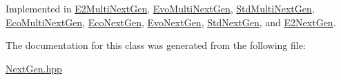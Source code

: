 Implemented in \hyperlink{classE2MultiNextGen_a22721fa0e9c2cbe1de3d0d6bb78932f0}{E2\+Multi\+Next\+Gen}, \hyperlink{classEvoMultiNextGen_acab6fd876dc02feae353b52461b88861}{Evo\+Multi\+Next\+Gen}, \hyperlink{classStdMultiNextGen_a4e3a48cdc731da26abe8b1f32cdbf962}{Std\+Multi\+Next\+Gen}, \hyperlink{classEcoMultiNextGen_a956065141696cac390d8acb8ca5bcccb}{Eco\+Multi\+Next\+Gen}, \hyperlink{classEcoNextGen_a4cb2fccbd3221f41c249c97af461dd3c}{Eco\+Next\+Gen}, \hyperlink{classEvoNextGen_af9ee37c63b6b2c22d27194b6b507c75a}{Evo\+Next\+Gen}, \hyperlink{classStdNextGen_a2253fef9e33f6fe5f2e84f4dc89cfcd2}{Std\+Next\+Gen}, and \hyperlink{classE2NextGen_a2c5d35d9c8f9395cbd58d8fb837a08da}{E2\+Next\+Gen}.



The documentation for this class was generated from the following file\+:\begin{DoxyCompactItemize}
\item 
\hyperlink{NextGen_8hpp}{Next\+Gen.\+hpp}\end{DoxyCompactItemize}
